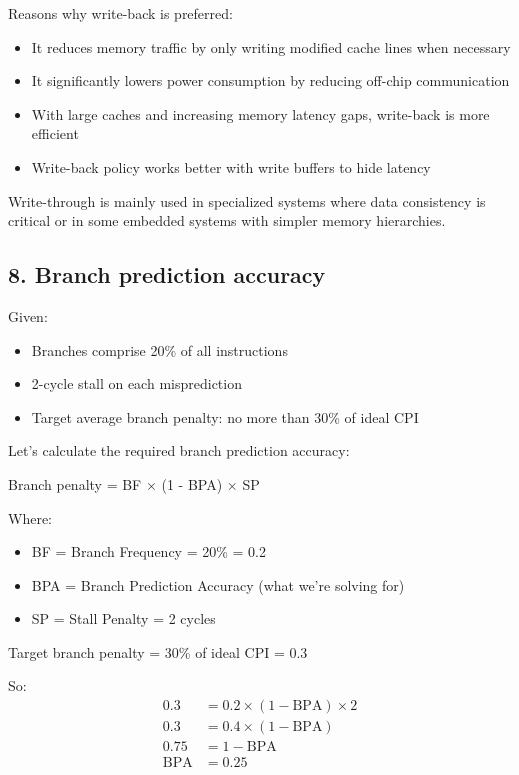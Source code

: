 \documentclass[12pt]{article}
\begin{document}
Reasons why write-back is preferred:
\begin{itemize}
    \item It reduces memory traffic by only writing modified cache lines when necessary
    \item It significantly lowers power consumption by reducing off-chip communication
    \item With large caches and increasing memory latency gaps, write-back is more efficient
    \item Write-back policy works better with write buffers to hide latency
\end{itemize}

Write-through is mainly used in specialized systems where data consistency is critical or in some embedded systems with simpler memory hierarchies.

\subsection*{8. Branch prediction accuracy}
Given:
\begin{itemize}
    \item Branches comprise 20\% of all instructions
    \item 2-cycle stall on each misprediction
    \item Target average branch penalty: no more than 30\% of ideal CPI
\end{itemize}

Let's calculate the required branch prediction accuracy:

Branch penalty = BF $\times$ (1 - BPA) $\times$ SP

Where:
\begin{itemize}
    \item BF = Branch Frequency = 20\% = 0.2
    \item BPA = Branch Prediction Accuracy (what we're solving for)
    \item SP = Stall Penalty = 2 cycles
\end{itemize}

Target branch penalty = 30\% of ideal CPI = 0.3

So:
\begin{align}
0.3 &= 0.2 \times (1 - \text{BPA}) \times 2\\
0.3 &= 0.4 \times (1 - \text{BPA})\\
0.75 &= 1 - \text{BPA}\\
\text{BPA} &= 0.25
\end{align}
\end{document}
